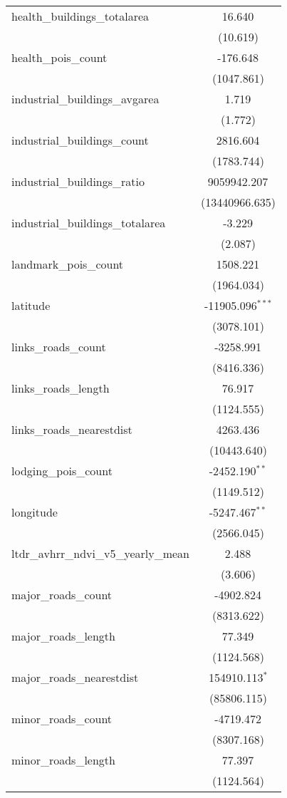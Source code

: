 \begin{table}[!htbp]
\begin{tabular}{@{\extracolsep{5pt}}lc}
 health_buildings_totalarea & 16.640$^{}$ \\
  & (10.619) \\
 health_pois_count & -176.648$^{}$ \\
  & (1047.861) \\
 industrial_buildings_avgarea & 1.719$^{}$ \\
  & (1.772) \\
 industrial_buildings_count & 2816.604$^{}$ \\
  & (1783.744) \\
 industrial_buildings_ratio & 9059942.207$^{}$ \\
  & (13440966.635) \\
 industrial_buildings_totalarea & -3.229$^{}$ \\
  & (2.087) \\
 landmark_pois_count & 1508.221$^{}$ \\
  & (1964.034) \\
 latitude & -11905.096$^{***}$ \\
  & (3078.101) \\
 links_roads_count & -3258.991$^{}$ \\
  & (8416.336) \\
 links_roads_length & 76.917$^{}$ \\
  & (1124.555) \\
 links_roads_nearestdist & 4263.436$^{}$ \\
  & (10443.640) \\
 lodging_pois_count & -2452.190$^{**}$ \\
  & (1149.512) \\
 longitude & -5247.467$^{**}$ \\
  & (2566.045) \\
 ltdr_avhrr_ndvi_v5_yearly_mean & 2.488$^{}$ \\
  & (3.606) \\
 major_roads_count & -4902.824$^{}$ \\
  & (8313.622) \\
 major_roads_length & 77.349$^{}$ \\
  & (1124.568) \\
 major_roads_nearestdist & 154910.113$^{*}$ \\
  & (85806.115) \\
 minor_roads_count & -4719.472$^{}$ \\
  & (8307.168) \\
 minor_roads_length & 77.397$^{}$ \\
  & (1124.564) \\

\end{tabular}
\end{table}
